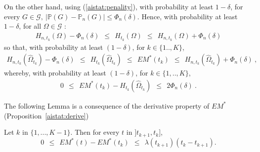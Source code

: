 On the other hand, using (\ref{aistat:penality}),  with probability at least $1-\delta$, for every $G \in \mathcal{G},~ |\mathbb{P}(G)-\mathbb{P}_n (G)| \leq \Phi_n(\delta)$. 
Hence, with probability at least $1-\delta$, for all $\Omega \in \mathcal{G}$ :
\begin{align*}
H_{n,t_k}(\Omega)-\Phi_n(\delta) ~~\le~~ H_{t_k}(\Omega) ~~\le~~ H_{n,t_k}(\Omega) + \Phi_n(\delta)
\end{align*}
\noindent so that, with probability at least $(1-\delta)$, for $k \in \{1..,K\}$,
\begin{align*}
H_{n,t_k}(\hat \Omega_{t_k})-\Phi_n(\delta) ~~\le~~ H_{t_k}(\hat \Omega_{t_k}) 
 ~~\le~~ EM^*(t_k) 
~~\le~~ H_{n,t_k}(\hat \Omega_{t_k}) + \Phi_n(\delta) ~,
\end{align*}
\noindent whereby, with probability at least $(1-\delta)$, for $k \in \{1,..,K\}$,
\begin{align*}
0 ~~\le~~ EM^*(t_k) - H_{t_k}(\hat \Omega_{t_k}) ~~\le~~ 2 \Phi_n(\delta)~.
\end{align*}


The following Lemma is a consequence of the derivative property of $EM^*$ (Proposition~\ref{aistat:derive}) 
\begin{lemma}
\label{aistat:lemmederive}
Let $k$ in $\{1,...,K-1\}$. Then for every $t$ in $]t_{k+1},t_{k}]$,
$$0 ~~\le~~ EM^*(t)-EM^*(t_{k}) ~~\le~~ \lambda(t_{k+1}) (t_{k}-t_{k+1}).$$
\end{lemma}

